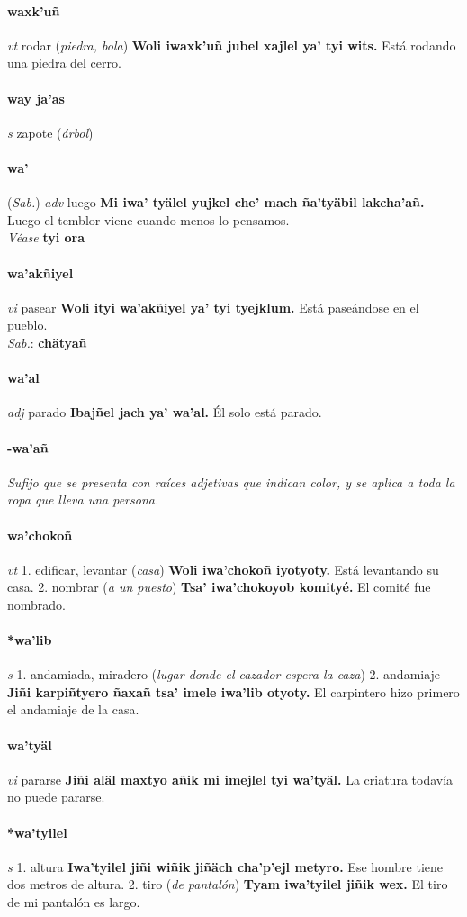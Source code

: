 \documentclass{scrbook}
\newcommand{\entry}[1]{\paragraph{#1}}
\newcommand{\onedefinition}[1]{#1.}
\newcommand{\nontranslationdef}[1]{\textit{#1}}
\newcommand{\partofspeech}[1]{\textit{#1}}
\newcommand{\spanishtranslation}[1]{#1}
\newcommand{\clarification}[1]{(\textit{#1})}
\newcommand{\cholexample}[1]{\textbf{#1}}
\newcommand{\exampletranslation}[1]{#1}
\newcommand{\dialectvariant}[1]{\\\textit{#1}:}
\newcommand{\dialectword}[1]{\textbf{#1}}
\newcommand{\alsosee}[1]{\\\textit{Véase} \textbf{#1}}
\newcommand{\relevantdialect}[1]{(\textit{#1})}
\begin{document}
\begin{multicols}{2}
\entry{waxk'uñ}
\partofspeech{vt}
\spanishtranslation{rodar}
\clarification{piedra, bola}
\cholexample{Woli iwaxk'uñ jubel xajlel ya' tyi wits.}
\exampletranslation{Está rodando una piedra del cerro.}

\entry{way ja'as}
\partofspeech{s}
\spanishtranslation{zapote}
\clarification{árbol}

\entry{wa'}
\relevantdialect{Sab.}
\partofspeech{adv}
\spanishtranslation{luego}
\cholexample{Mi iwa' tyälel yujkel che' mach ña'tyäbil lakcha'añ.}
\exampletranslation{Luego el temblor viene cuando menos lo pensamos.}
\alsosee{tyi ora}

\entry{wa'akñiyel}
\partofspeech{vi}
\spanishtranslation{pasear}
\cholexample{Woli ityi wa'akñiyel ya' tyi tyejklum.}
\exampletranslation{Está paseándose en el pueblo.}
\dialectvariant{Sab.}
\dialectword{chätyañ}

\entry{wa'al}
\partofspeech{adj}
\spanishtranslation{parado}
\cholexample{Ibajñel jach ya' wa'al.}
\exampletranslation{Él solo está parado.}

\entry{-wa'añ}
\nontranslationdef{Sufijo que se presenta con raíces adjetivas que indican color, y se aplica a toda la ropa que lleva una persona.}

\entry{wa'chokoñ}
\partofspeech{vt}
\onedefinition{1}
\spanishtranslation{edificar, levantar}
\clarification{casa}
\cholexample{Woli iwa'chokoñ iyotyoty.}
\exampletranslation{Está levantando su casa.}
\onedefinition{2}
\spanishtranslation{nombrar}
\clarification{a un puesto}
\cholexample{Tsa' iwa'chokoyob komityé.}
\exampletranslation{El comité fue nombrado.}

\entry{*wa'lib}
\partofspeech{s}
\onedefinition{1}
\spanishtranslation{andamiada, miradero}
\clarification{lugar donde el cazador espera la caza}
\onedefinition{2}
\spanishtranslation{andamiaje}
\cholexample{Jiñi karpiñtyero ñaxañ tsa' imele iwa'lib otyoty.}
\exampletranslation{El carpintero hizo primero el andamiaje de la casa.}

\entry{wa'tyäl}
\partofspeech{vi}
\spanishtranslation{pararse}
\cholexample{Jiñi aläl maxtyo añik mi imejlel tyi wa'tyäl.}
\exampletranslation{La criatura todavía no puede pararse.}

\entry{*wa'tyilel}
\partofspeech{s}
\onedefinition{1}
\spanishtranslation{altura}
\cholexample{Iwa'tyilel jiñi wiñik jiñäch cha'p'ejl metyro.}
\exampletranslation{Ese hombre tiene dos metros de altura.}
\onedefinition{2}
\spanishtranslation{tiro}
\clarification{de pantalón}
\cholexample{Tyam iwa'tyilel jiñik wex.}
\exampletranslation{El tiro de mi pantalón es largo.}


\end{multicols}
\end{document}
